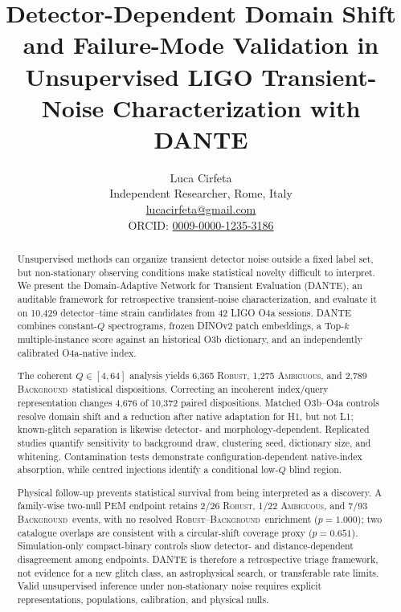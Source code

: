 \documentclass[12pt]{article}
\newcommand{\robust}{\textsc{Robust}}
\newcommand{\ambiguous}{\textsc{Ambiguous}}
\newcommand{\background}{\textsc{Background}}
\begin{document}
\title{Detector-Dependent Domain Shift and Failure-Mode Validation in
Unsupervised LIGO Transient-Noise Characterization with DANTE}

\author{Luca Cirfeta\\
\small Independent Researcher, Rome, Italy\\
\small \href{mailto:lucacirfeta@gmail.com}{lucacirfeta@gmail.com}\\
\small ORCID: \href{https://orcid.org/0009-0000-1235-3186}{0009-0000-1235-3186}}
\date{}

\maketitle
\begin{abstract}
Unsupervised methods can organize transient detector noise outside a fixed
label set, but non-stationary observing conditions make statistical novelty
difficult to interpret. We present the Domain-Adaptive Network for Transient
Evaluation (DANTE), an auditable framework for retrospective transient-noise
characterization, and evaluate it on 10,429 detector--time strain candidates
from 42 LIGO O4a sessions. DANTE combines constant-$Q$ spectrograms, frozen
DINOv2 patch embeddings, a Top-$k$ multiple-instance score against an
historical O3b dictionary, and an independently calibrated O4a-native index.

The coherent $Q\in[4,64]$ analysis yields 6,365 \robust, 1,275 \ambiguous,
and 2,789 \background\ statistical dispositions. Correcting an incoherent
index/query representation changes 4,676 of 10,372 paired dispositions.
Matched O3b--O4a controls resolve domain shift and a reduction after native
adaptation for H1, but not L1; known-glitch separation is likewise detector-
and morphology-dependent. Replicated studies quantify sensitivity to
background draw, clustering seed, dictionary size, and whitening. Contamination
tests demonstrate configuration-dependent native-index absorption, while
centred injections identify a conditional low-$Q$ blind region.

Physical follow-up prevents statistical survival from being interpreted as a
discovery. A family-wise two-null PEM endpoint retains 2/26 \robust, 1/22 \ambiguous,
and 7/93 \background\ events, with no resolved \robust--\background\
enrichment ($p=1.000$); two catalogue overlaps are consistent with a
circular-shift coverage proxy ($p=0.651$). Simulation-only compact-binary
controls show detector- and distance-dependent disagreement among endpoints.
DANTE is therefore a retrospective triage framework, not evidence for a new
glitch class, an astrophysical search, or transferable rate limits. Valid
unsupervised inference under non-stationary noise requires explicit
representations, populations, calibration, and physical nulls.
\end{abstract}
\end{document}
